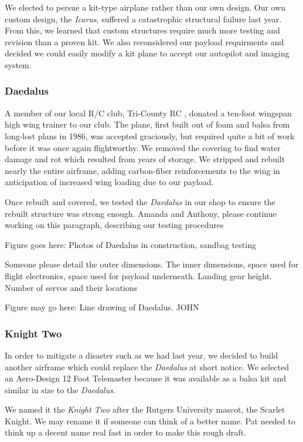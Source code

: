 \documentclass[10pt]{report}
\begin{document}
We elected to persue a kit-type airplane rather than our own design. 
Our own custom design, the \emph{Icarus}, suffered a catastrophic structural failure last year. From this, we learned that custom structures require much more testing and revision than a proven kit. We also reconsidered our payload requirments and decided we could easily modify a kit plane to accept our autopilot and imaging system.

\subsubsection{Daedalus}

A member of our local R/C club, Tri-County RC \cite{tricountyRC}, donated a ten-foot wingspan high wing trainer to our club. The plane, first built out of foam and balsa from long-lost plans in 1986, was accepted graciously, but required quite a bit of work before it was once again flightworthy. We removed the covering to find water damage and rot which resulted from years of storage. We stripped and rebuilt nearly the entire airframe, adding carbon-fiber reinforcements to the wing in anticipation of increased wing loading due to our payload.

Once rebuilt and covered, we tested the \emph{Daedalus} in our shop to ensure the rebuilt structure was strong enough. Amanda and Anthony, please continue working on this paragraph, describing our testing procedures

Figure goes here: Photos of Daedalus in construction, sandbag testing

Someone please detail the outer dimensions. The inner dimensions, space used for flight electronics, space used for payload underneath. Landing gear height. Number of servos and their locations

Figure may go here: Line drawing of Daedalus. JOHN

\subsubsection{Knight Two}

In order to mitigate a disaster such as we had last year, we decided to build another airframe which could replace the \emph{Daedalus} at short notice. We selected an Aero-Design 12 Foot Telemaster \cite{aerodesign} because it was available as a balsa kit and similar in size to the \emph{Daedalus}.

We named it the \emph{Knight Two} after the Rutgers University mascot, the Scarlet Knight. We may rename it if someone can think of a better name. Pat needed to think up a decent name real fast in order to make this rough draft.
\end{document}
